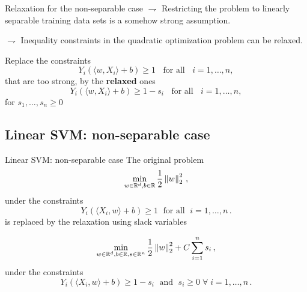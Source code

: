 \documentclass[xcolor={usenames,dvipsnames}]{beamer}
\begin{document}
 \begin{frame}{Relaxation for the non-separable case}
$\rightharpoondown$ Restricting the problem to linearly separable  training data sets is a \alert{somehow strong assumption}.

\vspace{.2cm}

$\rightharpoondown$ Inequality constraints in the quadratic optimization problem \alert{can be relaxed}.

\vspace{.2cm}


  Replace the constraints
  \begin{equation*}
    Y_i (\langle {w, X_i} \rangle  + b) \geq 1 \;\; \text{ for all } \;\;
    i=1, \ldots, n,
  \end{equation*}
  \pause
  that are too strong, by the \textbf{relaxed} ones
  \begin{equation*}
    Y_i (\langle {w, X_i} \rangle  + b) \geq 1 - s_i \;\; \text{ for all } \;\;
    i=1, \ldots, n,
  \end{equation*}
  for \textbf{} $s_1, \ldots, s_n \geq 0$
\end{frame}







\subsection{Linear SVM: non-separable case}

\begin{frame}{Linear SVM: non-separable case}
The original problem
$$
\min_{w \in \mathbb{R}^d, b \in \mathbb{R}} \frac 12 \left\| w \right\|_2^2\,,
$$
under the constraints
$$
Y_i (\langle {X_i, w} \rangle  + b) \geq 1 \; \text{ for all } 
  \;i=1, \ldots, n\,.
$$
is replaced by the relaxation using slack variables
\begin{block}{}
$$
\min_{w \in \mathbb{R}^d, b \in \mathbb{R}, s \in \mathbb{R}^n} \frac 12 \left\| w \right\|_2^2 
  + C \sum_{i=1}^n s_i\,,
$$
under the constraints
$$
Y_i (\langle {X_i, w} \rangle  + b) \geq 1 - s_i \; 
  \text{ and } \; s_i \geq 0 \; \forall  \;i=1, \ldots, n\,.
$$
\end{block}
\end{frame}
\end{document}
